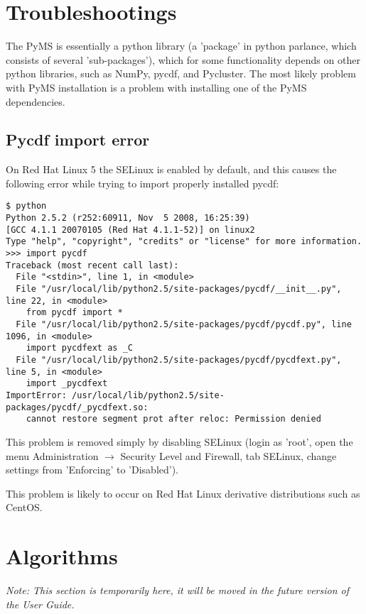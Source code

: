 \section{Troubleshootings}

The PyMS is essentially a python library (a 'package' in python parlance, which
consists of several 'sub-packages'), which for some functionality depends on
other python libraries, such as NumPy, pycdf, and Pycluster. The most likely
problem with PyMS installation is a problem with installing one of the PyMS
dependencies.

\subsection{Pycdf import error}

On Red Hat Linux 5 the SELinux is enabled by default, and this causes the
following error while trying to import properly installed pycdf: 

\begin{verbatim}
$ python
Python 2.5.2 (r252:60911, Nov  5 2008, 16:25:39)
[GCC 4.1.1 20070105 (Red Hat 4.1.1-52)] on linux2
Type "help", "copyright", "credits" or "license" for more information.
>>> import pycdf
Traceback (most recent call last):
  File "<stdin>", line 1, in <module>
  File "/usr/local/lib/python2.5/site-packages/pycdf/__init__.py", line 22, in <module>
    from pycdf import *
  File "/usr/local/lib/python2.5/site-packages/pycdf/pycdf.py", line 1096, in <module>
    import pycdfext as _C
  File "/usr/local/lib/python2.5/site-packages/pycdf/pycdfext.py", line 5, in <module>
    import _pycdfext
ImportError: /usr/local/lib/python2.5/site-packages/pycdf/_pycdfext.so:
    cannot restore segment prot after reloc: Permission denied
\end{verbatim}

This problem is removed simply by disabling SELinux (login as 'root', open the menu
Administration $\rightarrow$ Security Level and Firewall, tab SELinux, change settings
from 'Enforcing' to 'Disabled').

This problem is likely to occur on Red Hat Linux derivative distributions such as CentOS.

\section{Algorithms}

{\em Note: This section is temporarily here, it will be moved in the future
version of the User Guide.}

